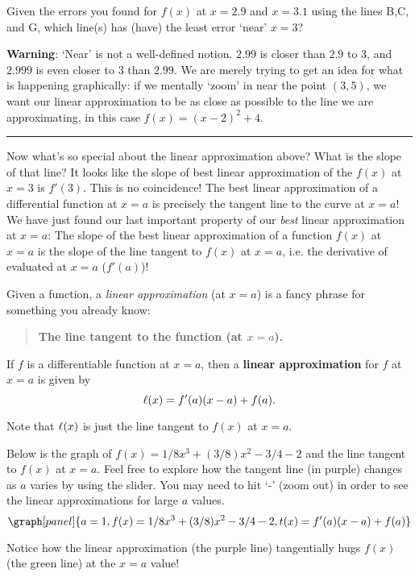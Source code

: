 \documentclass[handout,nooutcomes]{ximera}
\begin{document}
\begin{question}
Given the errors you found for $f(x)$ at $x=2.9$ and $x=3.1$ using the lines B,C, and G, which line(s) has (have) the least error `near' $x=3$?
\begin{selectAll}
\end{selectAll}
\end{question}

\textbf{Warning}: `Near' is not a well-defined notion. $2.99$ is closer than $2.9$
to $3$, and
$2.999$ is even closer to $3$ than $2.99$. We are merely trying to get 
an idea for what is happening graphically: if we mentally `zoom' in 
near the point $(3,5)$, we want our linear approximation to
be as close as possible to the line we are approximating, in this case $f(x) = (x-2)^2 + 4$.\\
\hrule
\medskip

Now what's so special about the linear approximation above? 
What is the slope of that line? It looks like the slope of best linear
approximation of the $f(x)$ at $x=3$ is $f'(3)$. This is no coincidence! 
The best linear approximation of a differential function at $x=a$
is precisely the tangent line to the curve at $x=a$! We have just found our last important property of our \textit{best} linear approximation at $x=a$: The slope of the best linear approximation of a function $f(x)$ at $x=a$ is the slope of the line tangent to $f(x)$ at $x=a$, i.e. the derivative of evaluated at $x=a$ ($f'(a)$)!\\
\medskip


Given a function, a \textit{linear approximation} (at $x=a$) is a fancy phrase
for something you already know:
\begin{center}
\begin{quote}
  \textbf{The line tangent to the function (at $x=a$).}
\end{quote}
\end{center}


\begin{definition}
If $f$ is a differentiable function at $x=a$, then a \textbf{linear
  approximation} for $f$ at $x=a$ is given by
\[
\ell(x) = f'(a)(x-a) +f(a).\\
\]
\end{definition}






Note that $\ell(x)$ is just the line tangent to $f(x)$ at $x=a$.


\begin{example}
Below is the graph of $f(x) = 1/8x^3 + (3/8)x^2 -3/4 - 2$ and the line
tangent to $f(x)$ at $x=a$. Feel free to explore how the tangent line
(in purple) changes as $a$ varies by using the slider. You may need to
hit `-' (zoom out) in order to see the linear approximations for large $a$ values.
\[
\graph[panel]{a=1, f(x) = 1/8x^3 + (3/8)x^2 -3/4 - 2, t(x) = f'(a)(x-a)+ f(a)}
\]

Notice how the linear approximation (the purple line) tangentially hugs
$f(x)$ (the green line) at the $x=a$ value!
\end{example}
\end{document}
